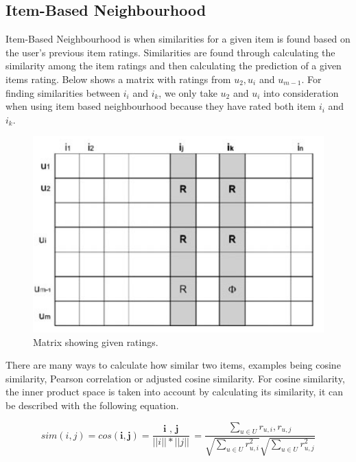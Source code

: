 \subsection{Item-Based Neighbourhood }

Item-Based Neighbourhood is when similarities for a given item is found based on the user's previous item ratings. Similarities are found through calculating the similarity among the item ratings and then calculating the prediction of a given items rating. Below shows a matrix with ratings from  $u_{2}, u_{i}$ and $u_{m-1}$. For finding similarities between $i_{i}$ and $i_{k}$, we only take $u_{2}$ and  $u_{i}$ into consideration when using item based neighbourhood because they have rated both item $i_{i}$ and $i_{k}$.  

\begin{figure}[H]
	\includegraphics[scale=0.65]{images/neigbourhood_based}
	\centering
	\caption{Matrix showing given ratings. \citep{celma_recommendation_2010}} 
\end{figure}

There are many ways to calculate how similar two items, examples being cosine similarity, Pearson correlation or adjusted cosine similarity. For cosine similarity, the inner product space is taken into account by calculating its similarity, it can be described with the following equation.

\begin{equation}
		sim(i , j) = cos( \textbf{i}, \textbf{j} ) = \frac{ \textbf{ i }, \textbf{ j }}{ || i || * || j || } = \frac{ \sum_{ u \in U } r_{ u, i }, r_{ u, j }} { \sqrt{ \sum _{  u \in U } r^{2}_{ u , i}} \sqrt{ \sum _{  u \in U } r^{2}_{ u , j}}}
\end{equation}

